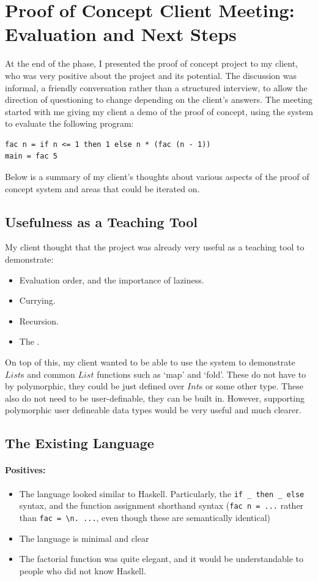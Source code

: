 \section{Proof of Concept Client Meeting: Evaluation and Next Steps}
\label{eval:c1_client}
At the end of the phase, I presented the proof of concept project to my client, who was very positive about the project and its potential. The discussion was informal, a friendly conversation rather than a structured interview, to allow the direction of questioning to change depending on the client's answers. The meeting started with me giving my client a demo of the proof of concept, using the system to evaluate the following program:
\begin{lstlisting}[language=SFL]
fac n = if n <= 1 then 1 else n * (fac (n - 1))
main = fac 5
\end{lstlisting}

\noindent Below is a summary of my client's thoughts about various aspects of the proof of concept system and areas that could be iterated on.

\subsection{Usefulness as a Teaching Tool}
My client thought that the project was already very useful as a teaching tool to demonstrate:
\begin{itemize}
    \item Evaluation order, and the importance of laziness.
    \item Currying.
    \item Recursion.
    \item The \lcalc.
\end{itemize}

\noindent On top of this, my client wanted to be able to use the system to demonstrate $List$s and common $List$ functions such as `map' and `fold'. These do not have to by polymorphic, they could be just defined over $Int$s or some other type. These also do not need to be user-definable, they can be built in. However, supporting polymorphic user defineable data types would be very useful and much clearer. 

\subsection{The Existing Language}
\paragraph{Positives:}
\begin{itemize}
    \item The language looked similar to Haskell. Particularly, the \verb|if _ then _ else| syntax, and the function assignment shorthand syntax (\verb|fac n = ...| rather than \verb|fac = \n. ...|, even though these are semantically identical)
    \item The language is minimal and clear
    \item The factorial function was quite elegant, and it would be understandable to people who did not know Haskell.  
\end{itemize}

